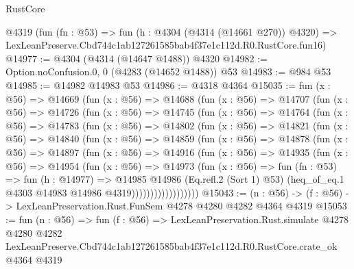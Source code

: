 \begin{lexlean}{RustCore}
\begin{coremodule}
    @4319
    (fun (fn : @53) =>
    fun (h : @4304 (@4314 (@14661 @270)) @4320) =>
    LexLeanPreserve.Cbd744c1ab127261585bab4f37e1c112d.R0.RustCore.fun16)
@14977 := @4304 (@4314 (@14647 @1488)) @4320
@14982 := Option.noConfusion.{0, 0} (@4283 (@14652 @1488)) @53
@14983 := @984 @53
@14985 := @14982 @14983 @53
@14986 := @4318 @4364
@15035 := fun (x : @56) =>
  @14669
    (fun (x : @56) =>
    @14688
      (fun (x : @56) =>
      @14707
        (fun (x : @56) =>
        @14726
          (fun (x : @56) =>
          @14745
            (fun (x : @56) =>
            @14764
              (fun (x : @56) =>
              @14783
                (fun (x : @56) =>
                @14802
                  (fun (x : @56) =>
                  @14821
                    (fun (x : @56) =>
                    @14840
                      (fun (x : @56) =>
                      @14859
                        (fun (x : @56) =>
                        @14878
                          (fun (x : @56) =>
                          @14897
                            (fun (x : @56) =>
                            @14916
                              (fun (x : @56) =>
                              @14935
                                (fun (x : @56) =>
                                @14954
                                  (fun (x : @56) =>
                                  @14973
                                    (fun (x : @56) =>
                                    fun (fn : @53) =>
                                    fun (h : @14977) =>
                                    @14985
                                      @14986
                                      (Eq.refl.{2} (Sort 1) @53)
                                      (heq_of_eq.{1} @4303 @14983 @14986 @4319))))))))))))))))))
@15043 := (n : @56) -> (f : @56) -> LexLeanPreservation.Rust.FunSem @4278 @4280 @4282 @4364 @4319
@15053 := fun (n : @56) =>
  fun (f : @56) =>
  LexLeanPreservation.Rust.simulate
    @4278
    @4280
    @4282
    LexLeanPreserve.Cbd744c1ab127261585bab4f37e1c112d.R0.RustCore.crate_ok
    @4364
    @4319
\end{coremodule}
\end{lexlean}
